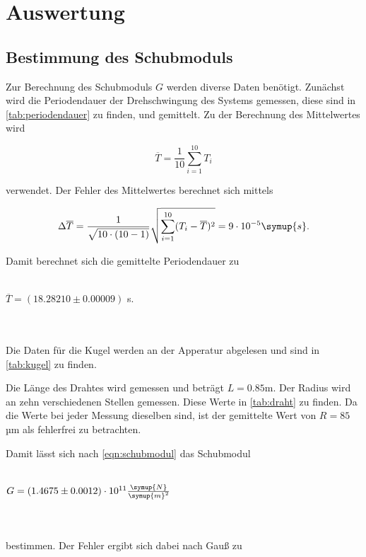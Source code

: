 \section{Auswertung}
\label{sec:Auswertung}
\subsection{Bestimmung des Schubmoduls}



Zur Berechnung des Schubmoduls $G$ werden diverse Daten benötigt. Zunächst wird die Periodendauer der Drehschwingung des Systems gemessen, diese sind in \autoref{tab:periodendauer} zu finden, und gemittelt.
Zu der Berechnung des Mittelwertes wird 

\begin{equation}
  \label{eqn:mittelwert}
  \overline{T} = \frac{1}{10} \sum_{i=1}^{10} T_i
\end{equation}

verwendet. Der Fehler des Mittelwertes berechnet sich mittels 

\begin{equation}
  \label{eqn:FehlerMittelwert}
  \Delta \overline{T} = \frac{1}{\sqrt{10 \cdot (10-1)}} \sqrt{ \sum_{i=1}^{10} (T_i - \overline{T})^2} = 9 \cdot 10^{-5} \symup{s}.
\end{equation}

Damit berechnet sich die gemittelte Periodendauer zu
\\ \\
\centerline{$\overline{T} = (18.28210 \pm 0.00009)$ s.}
\\ \\
Die Daten für die Kugel werden an der Apperatur abgelesen und sind in \autoref{tab:kugel} zu finden.



Die Länge des Drahtes wird gemessen und beträgt $L = 0.85$m. Der Radius wird an zehn verschiedenen Stellen gemessen. Diese Werte in \autoref{tab:draht} zu finden.
Da die Werte bei jeder Messung dieselben sind, ist der gemittelte Wert von $R = 85$µm als fehlerfrei zu betrachten.



Damit lässt sich nach \eqref{eqn:schubmodul} das Schubmodul
\\ \\
\centerline{$G = (1.4675 \pm 0.0012) \cdot 10^{11} \frac{\symup{N}}{\symup{m}^2}$}
\\ \\
bestimmen. Der Fehler ergibt sich dabei nach Gauß zu

